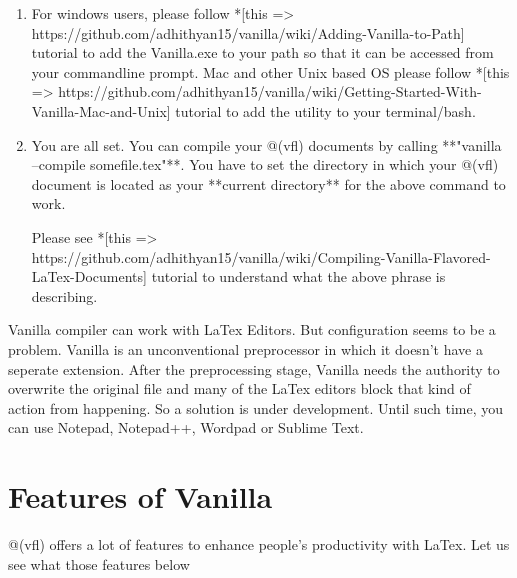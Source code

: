 \documentclass{article}
\begin{document}
\begin{enumerate}
\begin{itemize}
\end{itemize}

\item For windows users, please follow *[this => https://github.com/adhithyan15/vanilla/wiki/Adding-Vanilla-to-Path] tutorial to add the Vanilla.exe to your path so that it can be accessed from your commandline prompt. Mac and other Unix based OS please follow *[this => https://github.com/adhithyan15/vanilla/wiki/Getting-Started-With-Vanilla-Mac-and-Unix] tutorial to add the utility to your terminal/bash. 

\item You are all set. You can compile your @(vfl) documents by calling **"vanilla --compile somefile.tex"**. You have to set the directory in which your @(vfl) document is located as your **current directory** for the above command to work.

Please see *[this => https://github.com/adhithyan15/vanilla/wiki/Compiling-Vanilla-Flavored-LaTex-Documents] tutorial to understand what the above phrase is describing.    
 
\end{enumerate}

Vanilla compiler can work with LaTex Editors. But configuration seems to be a problem. Vanilla is an unconventional preprocessor in which it doesn't have a seperate extension. After the preprocessing stage, Vanilla needs the authority to overwrite the original file and many of the LaTex editors block that kind of action from happening. So a solution is under development. Until such time, you can use Notepad, Notepad++, Wordpad or Sublime Text. 

\section*{Features of Vanilla}

@(vfl) offers a lot of features to enhance people's productivity with LaTex. Let us see what those features below
\end{document}
